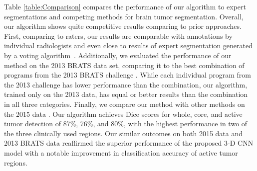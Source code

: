\documentclass{llncs}
\begin{document}
\indent Table \ref{table:Comparison} compares the performance of our algorithm to expert segmentations and competing methods for brain tumor segmentation. Overall, our algorithm shows quite competitive results comparing to prior approaches. First, comparing to raters, our results are comparable with annotations by individual radiologists and even close to results of expert segmentation generated by a voting algorithm~\cite{brats}. Additionally, we evaluated the performance of our method on the 2013 BRATS data set, comparing it to the best combination of programs from the 2013 BRATS challenge \cite{brats}. While each individual program from the 2013 challenge has lower performance than the combination, our algorithm, trained only on the 2013 data, has equal or better results than the combination in all three categories.  Finally, we compare our method with other methods on the 2015 data \cite{brats2015}. Our algorithm achieves Dice scores for whole, core, and active tumor detection of 87\%, 76\%, and 80\%, with the highest performance in two of the three clinically used regions. Our similar outcomes on both 2015 data and 2013 BRATS data reaffirmed the superior performance of the proposed 3-D CNN model with a notable improvement in classification accuracy of active tumor regions. 
\end{document}

